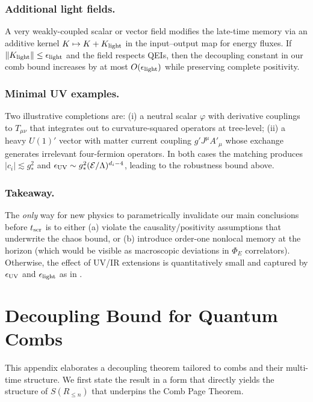 \documentclass[aps,prd,preprint,onecolumn,superscriptaddress,nofootinbib,longbibliography,floatfix,11pt,showpacs,showkeys]{revtex4-2}
\newcommand{\Eflux}{\Phi_E}
\theoremstyle{plain}
\theoremstyle{definition}
\theoremstyle{remark}
\begin{document}
\subsubsection{Additional light fields.} A very weakly-coupled scalar or vector field modifies the late-time memory via an additive kernel $K\mapsto K+K_{\rm light}$ in the input--output map for energy fluxes. If $\|K_{\rm light}\|\le \epsilon_{\rm light}$ and the field respects QEIs, then the decoupling constant in our comb bound increases by at most $O(\epsilon_{\rm light})$ while preserving complete positivity.

\subsubsection{Minimal UV examples.} Two illustrative completions are: (i) a neutral scalar $\varphi$ with derivative couplings to $T_{\mu\nu}$ that integrates out to curvature-squared operators at tree-level; (ii) a heavy $U(1)'$ vector with matter current coupling $g' J^\mu A'_\mu$ whose exchange generates irrelevant four-fermion operators. In both cases the matching produces $|c_i|\lesssim g_\ast^2$ and $\epsilon_{\rm UV}\sim g_\ast^2(\mathcal{E}/\Lambda)^{d_i-4}$, leading to the robustness bound above.

\subsubsection{Takeaway.} The \emph{only} way for new physics to parametrically invalidate our main conclusions before $t_{\rm scr}$ is to either (a) violate the causality/positivity assumptions that underwrite the chaos bound, or (b) introduce order-one nonlocal memory at the horizon (which would be visible as macroscopic deviations in $\Eflux$ correlators). Otherwise, the effect of UV/IR extensions is quantitatively small and captured by $\epsilon_{\rm UV}$ and $\epsilon_{\rm light}$ as in .


\appendix

\section{Decoupling Bound for Quantum Combs}
\label{app:decoupling}
This appendix elaborates a decoupling theorem tailored to combs and their multi-time structure. We first state the result in a form that directly yields the structure of $S(R_{\le n})$ that underpins the Comb Page Theorem.
\end{document}
